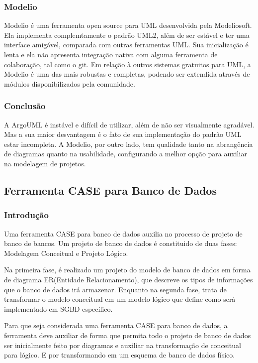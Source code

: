\documentclass[12pt,a4paper]{article}
\begin{document}
		\subsubsection{Modelio}
			Modelio é uma ferramenta open source para UML desenvolvida pela Modeliosoft.
			Ela implementa complemtamente o padrão UML2, além de ser estável e ter uma interface
			amigável, comparada com outras ferramentas UML. Sua inicialização é lenta e ela não
			apresenta integração nativa com alguma ferramenta de colaboração, tal como o git.
			Em relação à outros sistemas gratuitos para UML, a Modelio é uma das mais robustas
			e completas, podendo ser extendida através de módulos disponibilizados pela comunidade.
		\subsubsection{Conclusão}
			A ArgoUML é instável e difícil de utilizar, além de não ser visualmente agradável. Mas
			a sua maior desvantagem é o fato de sua implementação do padrão UML estar incompleta.
			A Modelio, por outro lado, tem qualidade tanto na abrangência de diagramas quanto
			na usabilidade, configurando a melhor opção para auxiliar na modelagem de projetos.

	\clearpage
	\subsection{Ferramenta CASE para Banco de Dados}
		\subsubsection{Introdução}
			Uma ferramenta CASE para banco de dados auxilia no processo de projeto de banco de bancos. Um projeto de banco de
			dados é constituido de duas fases: Modelagem Conceitual e Projeto Lógico. 
			
			Na primeira fase, é realizado um projeto do modelo de banco de dados em forma de diagrama ER(Entidade
			Relacionamento), que descreve os tipos de informações que o banco de dados irá armazenar. Enquanto na segunda fase,
			trata de transformar o modelo conceitual em um modelo lógico que define como será implementado em SGBD específico.
			
			Para que seja considerada uma ferramenta CASE para banco de dados, a ferramenta deve auxiliar de forma que permita
			todo o projeto de banco de dados ser inicialmente feito por diagramas e auxiliar na transformação de conceitual para
			lógico. E por transformando em um esquema de banco de dados físico.
			
\end{document}
